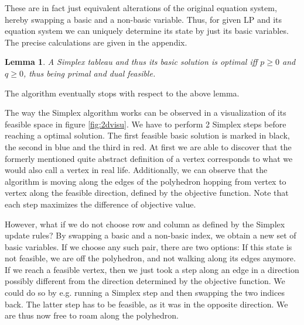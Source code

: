 \documentclass[a4paper, 11pt]{article}
\newtheorem{lemma}{Lemma}
\begin{document}
These are in fact just equivalent alterations of the original equation system, hereby swapping a basic and a non-basic variable. Thus, for given LP and its equation system we can uniquely determine its state by just its basic variables. The precise calculations are given in the appendix.

\begin{lemma}
	A Simplex tableau and thus its basic solution is optimal iff $p\geq0$ and $q\geq0$, thus being primal and dual feasible.
\end{lemma}

The algorithm eventually stops with respect to the above lemma. \medskip

The way the Simplex algorithm works can be observed in a visualization of its feasible space in figure \ref{fig:2dvisu}. We have to perform 2 Simplex steps before reaching a optimal solution. The first feasible basic solution is marked in black, the second in blue and the third in red. At first we are able to discover that the formerly mentioned quite abstract definition of a vertex corresponds to what we would also call a vertex in real life. Additionally, we can observe that the algorithm is moving along the edges of the polyhedron hopping from vertex to vertex along the feasible direction, defined by the objective function. Note that each step maximizes the difference of objective value. \medskip

However, what if we do not choose row and column as defined by the Simplex update rules? By swapping a basic and a non-basic index, we obtain a new set of basic variables. If we choose any such pair, there are two options: If this state is not feasible, we are off the polyhedron, and not walking along its edges anymore. If we reach a feasible vertex, then we just took a step along an edge in a direction possibly different from the direction determined by the objective function. We could do so by e.g. running a Simplex step and then swapping the two indices back. The latter step has to be feasible, as it was in the opposite direction. We are thus now free to roam along the polyhedron.
\end{document}
